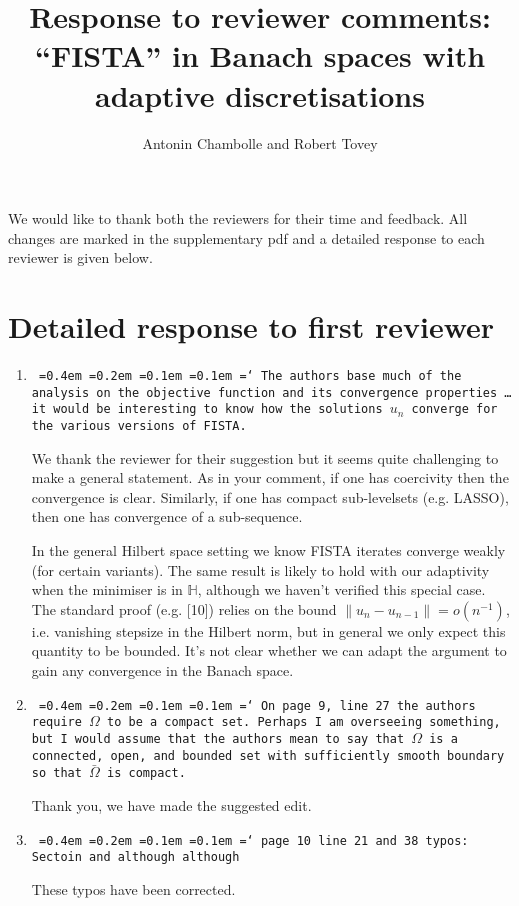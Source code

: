 \documentclass[12pt]{article}
\title{Response to reviewer comments:\\``FISTA'' in Banach spaces with adaptive discretisations}
\author{Antonin Chambolle and Robert Tovey}
\date{\todo{31st October 2021}}
\newcommand*\justify{%
	\fontdimen2\font=0.4em%
	\fontdimen3\font=0.2em%
	\fontdimen4\font=0.1em%
	\fontdimen7\font=0.1em%
	\hyphenchar\font=`\-%
}
\newcommand{\review}[1]{\texttt{\justify{#1}}}
\newcommand{\F}[1]{\mathbb{#1}}
\begin{document}
\maketitle

We would like to thank both the reviewers for their time and feedback. All changes are marked in the supplementary pdf and a detailed response to each reviewer is given below.


\section{Detailed response to first reviewer}

\begin{enumerate}
	\item \review{The authors base much of the analysis on the objective function and its convergence properties \ldots it would be interesting to know how the solutions $u_n$ converge for the various versions of FISTA.} 
	
	We thank the reviewer for their suggestion but it seems quite challenging to make a general statement. As in your comment, if one has coercivity then the convergence is clear. Similarly, if one has compact sub-levelsets (e.g. LASSO), then one has convergence of a sub-sequence.
	
	In the general Hilbert space setting we know FISTA iterates converge weakly (for certain variants). The same result is likely to hold with our adaptivity when the minimiser is in $\F H$, although we haven't verified this special case. The standard proof (e.g. [10]) relies on the bound $\lVert u_n-u_{n-1}\rVert = o(n^{-1})$, i.e. vanishing stepsize in the Hilbert norm, but in general we only expect this quantity to be bounded. It's not clear whether we can adapt the argument to gain any convergence in the Banach space. 
	
	\item \review{On page 9, line 27 the authors require $\Omega$ to be a compact set. Perhaps I am overseeing something, but I would assume that the authors mean to say that $\Omega$ is a connected, open, and bounded set with sufficiently smooth boundary so that $\bar\Omega$ is compact.}
	
	Thank you, we have made the suggested edit.

	\item \review{page 10 line 21 and 38 typos: Sectoin and although although}
	
	These typos have been corrected.
	

\end{enumerate}
\end{document}
